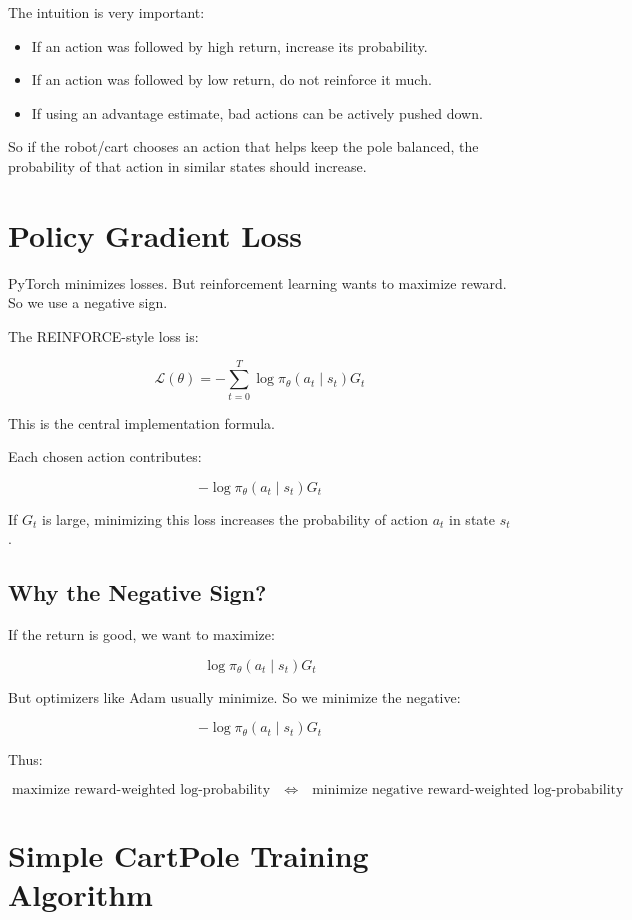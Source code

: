 \documentclass[11pt]{article}
\begin{document}
The intuition is very important:

\begin{itemize}[leftmargin=2em]
    \item If an action was followed by high return, increase its probability.
    \item If an action was followed by low return, do not reinforce it much.
    \item If using an advantage estimate, bad actions can be actively pushed down.
\end{itemize}

So if the robot/cart chooses an action that helps keep the pole balanced, the probability of that action in similar states should increase.

\section{Policy Gradient Loss}

PyTorch minimizes losses.
But reinforcement learning wants to maximize reward.
So we use a negative sign.

The REINFORCE-style loss is:

\[
\boxed{
\mathcal{L}(\theta)
= - \sum_{t=0}^{T} \log \pi_\theta(a_t \mid s_t) G_t
}
\]

This is the central implementation formula.

Each chosen action contributes:

\[
-\log \pi_\theta(a_t \mid s_t) G_t
\]

If $G_t$ is large, minimizing this loss increases the probability of action $a_t$ in state $s_t$.

\subsection{Why the Negative Sign?}

If the return is good, we want to maximize:

\[
\log \pi_\theta(a_t \mid s_t) G_t
\]

But optimizers like Adam usually minimize.
So we minimize the negative:

\[
-\log \pi_\theta(a_t \mid s_t) G_t
\]

Thus:

\[
\text{maximize reward-weighted log-probability}
\quad \Longleftrightarrow \quad
\text{minimize negative reward-weighted log-probability}
\]

\section{Simple CartPole Training Algorithm}
\end{document}
